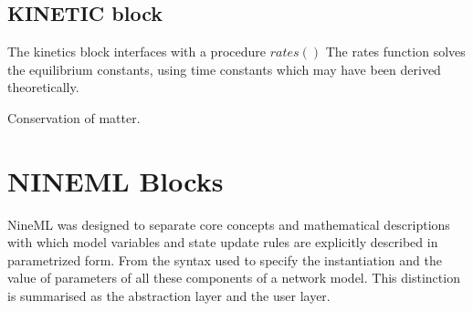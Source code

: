 \documentclass[draftspec]{ninemlspec}
\begin{document}



\subsection{KINETIC block}



The kinetics block interfaces with a procedure $rates()$
The rates function solves the equilibrium constants, using time constants which may have been derived theoretically.

Conservation of matter.
 

%
%



\section{NINEML Blocks}


NineML was designed to separate core concepts and mathematical descriptions with which model variables and state update rules are explicitly described in parametrized form.  From the syntax used to specify the instantiation and the value of parameters of all these components of a network model. This distinction is summarised as the abstraction layer and the user layer.
\end{document}
